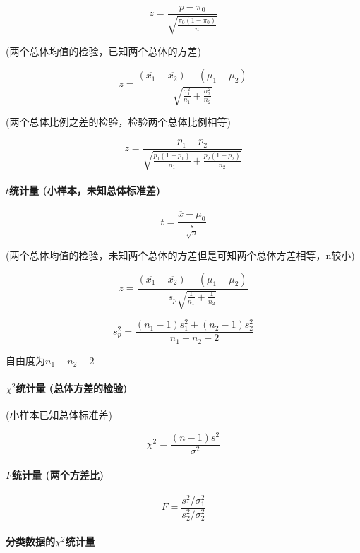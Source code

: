 \documentclass[UTF8,10pt]{book}
\begin{document}
                $$z=\frac{p-\pi_0}{\sqrt{\frac{\pi_0(1-\pi_0)}{n}}}$$
                
                (两个总体均值的检验，已知两个总体的方差)

                $$z=\frac{(\overline{x_1}-\overline{x_2})-(\mu_1-\mu_2)}{\sqrt{\frac{\sigma_1^2}{n_1}+\frac{\sigma_2^2}{n_2}}}$$
                
                (两个总体比例之差的检验，检验两个总体比例相等)

                $$z=\frac{p_1-p_2}{\sqrt{\frac{p_1 (1-p_1)}{n_1}+\frac{p_2 (1-p_2)}{n_2}}}$$
            
            
            \paragraph{$t$统计量  (小样本，未知总体标准差)}

                $$t=\frac{\overline{x}-\mu_0}{\frac{s}{\sqrt{n}}}$$
                
                (两个总体均值的检验，未知两个总体的方差但是可知两个总体方差相等，n较小)

                $$z=\frac{(\overline{x_1}-\overline{x_2})-(\mu_1-\mu_2)}{s_p \sqrt{\frac{1}{n_1}+\frac{1}{n_2}}}$$
            
                $$s_p^2 = \frac{(n_1-1)s_1^2+(n_2-1)s_2^2}{n_1+n_2-2}$$

                自由度为$n_1+n_2-2$
            
            \paragraph{$\chi^2$统计量 (总体方差的检验)}

                (小样本已知总体标准差)

                $$ \chi^2=\frac{(n-1)s^2}{\sigma^2} $$
            
            \paragraph{$F$统计量 (两个方差比)}

                $$F=\frac{{s_1^2}/ {\sigma_1^2}}{{s_2^2}/{\sigma_2^2}}$$
            
            \paragraph{分类数据的$\chi^2$统计量}
\end{document}
